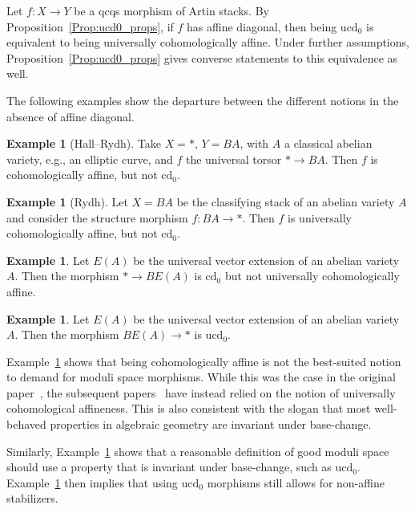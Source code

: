 \documentclass[a4paper,twoside,11pt]{amsart}
\theoremstyle{plain}
\theoremstyle{definition}
\newtheorem{example}[theorem]{Example}
\theoremstyle{remark}
\numberwithin{equation}{section}
\newcommand{\cd}{\mathrm{cd}}
\newcommand{\ucd}{$\mathrm{ucd}_{0}$\xspace}
\renewcommand{\cd}{$\mathrm{cd}_{0}$\xspace}
\begin{document}
Let $f \colon X \to Y$ be a qcqs morphism of Artin stacks. By Proposition~\ref{Prop:ucd0_props}, if $f$ has affine diagonal, then being \ucd is equivalent to being universally cohomologically affine. Under further assumptions, Proposition~\ref{Prop:ucd0_props} gives converse statements to this equivalence as well. 

The following examples show the departure between the different notions in the absence of affine diagonal.

\begin{example}[Hall--Rydh] \label{example:gms1}
    Take $X = \ast$, $Y=BA$, with $A$ a classical abelian variety, e.g., an elliptic curve, and $f$ the universal torsor $* \to BA$. Then $f$ is cohomologically affine, but not \cd.
\end{example}

\begin{example}[Rydh] \label{example:gms2}
    Let $X=BA$ be the classifying stack of an abelian variety $A$ and consider the structure morphism $f \colon BA \to \ast$. Then $f$ is universally cohomologically affine, but not \cd.
\end{example}

\begin{example}\cite[Rem.~1.6]{HallRydhGroups} \label{example:gms3}
    Let $E(A)$ be the universal vector extension of an abelian variety $A$. Then the morphism $\ast \to BE(A)$ is \cd but not universally cohomologically affine.
\end{example}

\begin{example}\cite[Rem.~1.6]{HallRydhGroups} \label{example:gms4}
    Let $E(A)$ be the universal vector extension of an abelian variety $A$. Then the morphism $BE(A) \to \ast$ is \ucd.
\end{example}

Example~\ref{example:gms1} shows that being cohomologically affine is not the best-suited notion to demand for moduli space morphisms. While this was the case in the original paper~\cite{AlperGood}, the subsequent papers~\cite{AHR2,AlperLuna,FerrandPush} have instead relied on the notion of universally cohomological affineness. This is also consistent with the slogan that most well-behaved properties in algebraic geometry are invariant under base-change.

Similarly, Example~\ref{example:gms3} shows that a reasonable definition of good moduli space should use a property that is invariant under base-change, such as \ucd. Example~\ref{example:gms4} then implies that using \ucd morphisms still allows for non-affine stabilizers.
\end{document}
